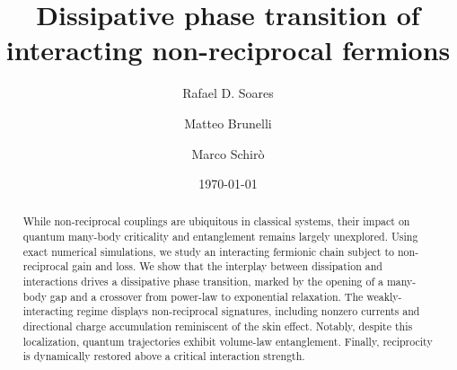 \documentclass[floatfix,reprint,amsmath,amssymb,superscriptaddress,aps,prl]{revtex4-2}
\begin{document}
\date{\today}

\title{Dissipative phase transition of interacting non-reciprocal fermions}

\author{Rafael D. Soares}
\author{Matteo Brunelli}
\author{Marco Schir\`o}


\begin{abstract}
While non-reciprocal couplings are ubiquitous in classical systems, their impact on quantum many-body criticality and entanglement remains largely unexplored. Using exact numerical simulations, we study an interacting fermionic chain subject to non-reciprocal gain and loss. We show that the interplay between dissipation and interactions drives a dissipative phase transition, marked by the opening of a many-body gap and a crossover from power-law to exponential relaxation. The weakly-interacting regime displays non-reciprocal signatures, including nonzero currents and directional charge accumulation reminiscent of the skin effect. Notably, despite this localization, quantum trajectories exhibit volume-law entanglement. Finally, reciprocity is dynamically restored above a critical interaction strength.
\end{abstract}

\maketitle
\end{document}
